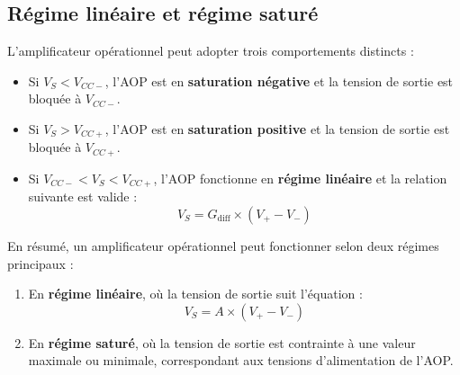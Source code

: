 \subsection{Régime linéaire et régime saturé}

L'amplificateur opérationnel peut adopter trois comportements distincts :

\begin{itemize}
    \item Si \( V_S < V_{CC-} \), l'AOP est en \textbf{saturation négative} et la tension de sortie est bloquée à \( V_{CC-} \).
    \item Si \( V_S > V_{CC+} \), l'AOP est en \textbf{saturation positive} et la tension de sortie est bloquée à \( V_{CC+} \).
    \item Si \( V_{CC-} < V_S < V_{CC+} \), l'AOP fonctionne en \textbf{régime linéaire} et la relation suivante est valide :
    \[
    V_S = G_{\text{diff}} \times (V_+ - V_-)
    \]
\end{itemize}

En résumé, un amplificateur opérationnel peut fonctionner selon deux régimes principaux :

\begin{enumerate}
    \item En \textbf{régime linéaire}, où la tension de sortie suit l'équation :
    \[
    V_S = A \times (V_+ - V_-)
    \]
    \item En \textbf{régime saturé}, où la tension de sortie est contrainte à une valeur maximale ou minimale, correspondant aux tensions d'alimentation de l'AOP.
\end{enumerate}

